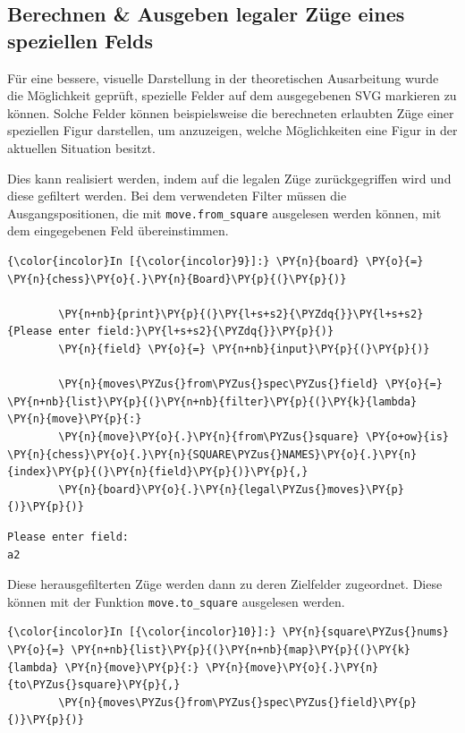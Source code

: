     \subsection{Berechnen \& Ausgeben legaler Züge eines speziellen
Felds}\label{berechnen-ausgeben-legaler-zuxfcge-eines-speziellen-felds}

Für eine bessere, visuelle Darstellung in der theoretischen Ausarbeitung
wurde die Möglichkeit geprüft, spezielle Felder auf dem ausgegebenen SVG
markieren zu können. Solche Felder können beispielsweise die berechneten
erlaubten Züge einer speziellen Figur 
darstellen, um anzuzeigen, welche Möglichkeiten eine Figur in der
aktuellen Situation besitzt.

Dies kann realisiert werden, indem auf die legalen Züge zurückgegriffen
wird und diese gefiltert werden. Bei dem verwendeten Filter müssen die
Ausgangspositionen, die mit \texttt{move.from\_square} ausgelesen werden
können, mit dem eingegebenen Feld übereinstimmen.

    \begin{Verbatim}[commandchars=\\\{\}]
{\color{incolor}In [{\color{incolor}9}]:} \PY{n}{board} \PY{o}{=} \PY{n}{chess}\PY{o}{.}\PY{n}{Board}\PY{p}{(}\PY{p}{)}
        
        \PY{n+nb}{print}\PY{p}{(}\PY{l+s+s2}{\PYZdq{}}\PY{l+s+s2}{Please enter field:}\PY{l+s+s2}{\PYZdq{}}\PY{p}{)}
        \PY{n}{field} \PY{o}{=} \PY{n+nb}{input}\PY{p}{(}\PY{p}{)}
        
        \PY{n}{moves\PYZus{}from\PYZus{}spec\PYZus{}field} \PY{o}{=} \PY{n+nb}{list}\PY{p}{(}\PY{n+nb}{filter}\PY{p}{(}\PY{k}{lambda} \PY{n}{move}\PY{p}{:} 
		\PY{n}{move}\PY{o}{.}\PY{n}{from\PYZus{}square} \PY{o+ow}{is} \PY{n}{chess}\PY{o}{.}\PY{n}{SQUARE\PYZus{}NAMES}\PY{o}{.}\PY{n}{index}\PY{p}{(}\PY{n}{field}\PY{p}{)}\PY{p}{,} 
		\PY{n}{board}\PY{o}{.}\PY{n}{legal\PYZus{}moves}\PY{p}{)}\PY{p}{)}
\end{Verbatim}


    \begin{Verbatim}[commandchars=\\\{\}]
Please enter field:
a2

    \end{Verbatim}

    Diese herausgefilterten Züge werden dann zu deren Zielfelder zugeordnet.
Diese können mit der Funktion \texttt{move.to\_square} ausgelesen werden.

    \begin{Verbatim}[commandchars=\\\{\}]
{\color{incolor}In [{\color{incolor}10}]:} \PY{n}{square\PYZus{}nums} \PY{o}{=} \PY{n+nb}{list}\PY{p}{(}\PY{n+nb}{map}\PY{p}{(}\PY{k}{lambda} \PY{n}{move}\PY{p}{:} \PY{n}{move}\PY{o}{.}\PY{n}{to\PYZus{}square}\PY{p}{,} 
		\PY{n}{moves\PYZus{}from\PYZus{}spec\PYZus{}field}\PY{p}{)}\PY{p}{)}
\end{Verbatim}


